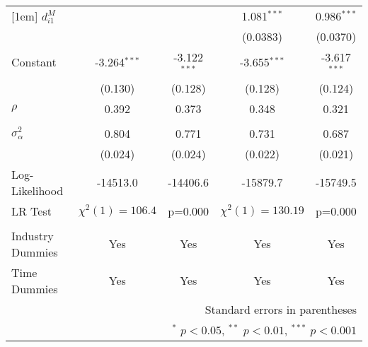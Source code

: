 \begin{center}
\begin{tabular}{l*{4}{c}}
[1em]
$d_{i1}^{M}$    &                     &                     &       1.081$^{***}$&       0.986$^{***}$\\
            &                     &                     &    (0.0383)         &    (0.0370)         \\
[1em]
Constant      &      -3.264$^{***}$&      -3.122$^{***}$&      -3.655$^{***}$&      -3.617$^{***}$\\
            &     (0.130)         &     (0.128)         &     (0.128)         &     (0.124)         \\
\hline
$\rho$         &       0.392         &       0.373         &       0.348         &       0.321         \\
                & & & & \\ 
$\sigma^{2}_{\alpha}$     &       0.804         &       0.771         &       0.731 &       0.687         \\
                & (0.024) & (0.024)&(0.022) & (0.021)\\
Log-Likelihood          &    -14513.0         &    -14406.6         &
                                                                      -15879.7
                                    &    -15749.5         \\
LR Test & $\chi^{2}(1)= 106.4 $ &p=0.000& $\chi^{2}(1)=130.19$
                                           & p=0.000 \\
& & &&\\

\hline
\hline
Industry Dummies & Yes& Yes& Yes& Yes\\
Time Dummies& Yes& Yes& Yes& Yes\\
\hline\hline
\multicolumn{5}{r}{\footnotesize Standard errors  in parentheses}\\
\multicolumn{5}{r}{\footnotesize $^{*}$ \(p<0.05\), $^{**}$ \(p<0.01\), $^{***}$ \(p<0.001\)}\\
\end{tabular}
\end{center}
